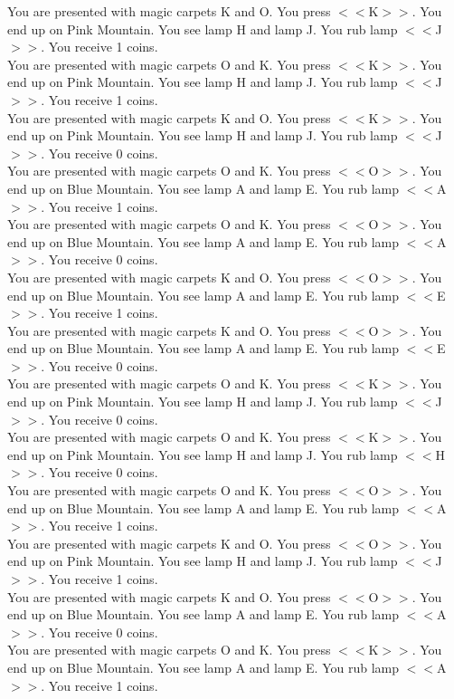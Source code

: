 \documentclass[pdflatex,sn-nature]{sn-jnl}%
\theoremstyle{thmstyleone}%
\theoremstyle{thmstyletwo}%
\theoremstyle{thmstylethree}%
\begin{document}
You are presented with magic carpets K and O. You press $<<$K$>>$. You end up on Pink Mountain. You see lamp H and lamp J. You rub lamp $<<$J$>>$. You receive 1 coins. $~$\\ 
You are presented with magic carpets O and K. You press $<<$K$>>$. You end up on Pink Mountain. You see lamp H and lamp J. You rub lamp $<<$J$>>$. You receive 1 coins. $~$\\ 
You are presented with magic carpets K and O. You press $<<$K$>>$. You end up on Pink Mountain. You see lamp H and lamp J. You rub lamp $<<$J$>>$. You receive 0 coins. $~$\\ 
You are presented with magic carpets O and K. You press $<<$O$>>$. You end up on Blue Mountain. You see lamp A and lamp E. You rub lamp $<<$A$>>$. You receive 1 coins. $~$\\ 
You are presented with magic carpets O and K. You press $<<$O$>>$. You end up on Blue Mountain. You see lamp A and lamp E. You rub lamp $<<$A$>>$. You receive 0 coins. $~$\\ 
You are presented with magic carpets K and O. You press $<<$O$>>$. You end up on Blue Mountain. You see lamp A and lamp E. You rub lamp $<<$E$>>$. You receive 1 coins. $~$\\ 
You are presented with magic carpets K and O. You press $<<$O$>>$. You end up on Blue Mountain. You see lamp A and lamp E. You rub lamp $<<$E$>>$. You receive 0 coins. $~$\\ 
You are presented with magic carpets O and K. You press $<<$K$>>$. You end up on Pink Mountain. You see lamp H and lamp J. You rub lamp $<<$J$>>$. You receive 0 coins. $~$\\ 
You are presented with magic carpets O and K. You press $<<$K$>>$. You end up on Pink Mountain. You see lamp H and lamp J. You rub lamp $<<$H$>>$. You receive 0 coins. $~$\\ 
You are presented with magic carpets O and K. You press $<<$O$>>$. You end up on Blue Mountain. You see lamp A and lamp E. You rub lamp $<<$A$>>$. You receive 1 coins. $~$\\ 
You are presented with magic carpets K and O. You press $<<$O$>>$. You end up on Pink Mountain. You see lamp H and lamp J. You rub lamp $<<$J$>>$. You receive 1 coins. $~$\\ 
You are presented with magic carpets K and O. You press $<<$O$>>$. You end up on Blue Mountain. You see lamp A and lamp E. You rub lamp $<<$A$>>$. You receive 0 coins. $~$\\ 
You are presented with magic carpets O and K. You press $<<$K$>>$. You end up on Blue Mountain. You see lamp A and lamp E. You rub lamp $<<$A$>>$. You receive 1 coins. $~$\\ 
\end{document}
